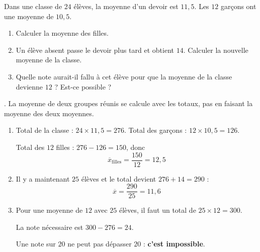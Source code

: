 
\newcommand{\R}{\mathbb{R}}
\newcommand{\vect}[1]{\overrightarrow{#1}}

Dans une classe de $24$ élèves, la moyenne d'un devoir est $11{,}5$. Les $12$ garçons ont une moyenne de $10{,}5$.
\begin{enumerate}
  \item Calculer la moyenne des filles.
  \item Un élève absent passe le devoir plus tard et obtient $14$. Calculer la nouvelle moyenne de la classe.
  \item Quelle note aurait-il fallu à cet élève pour que la moyenne de la classe devienne $12$ ? Est-ce possible ?
\end{enumerate}

\begin{prop}
. La moyenne de deux groupes réunis se calcule avec les totaux, pas en faisant la moyenne des deux moyennes.
\end{prop}
\begin{enumerate}[itemsep=14pt]
  \item Total de la classe : $24\times11{,}5=276$. \quad Total des garçons : $12\times10{,}5=126$.

  Total des $12$ filles : $276-126=150$, donc
  \[\overline x_{\text{filles}}=\dfrac{150}{12}=12{,}5\]

  \item Il y a maintenant $25$ élèves et le total devient $276+14=290$ :
  \[\overline x=\dfrac{290}{25}=11{,}6\]

  \item Pour une moyenne de $12$ avec $25$ élèves, il faut un total de $25\times12=300$.

  La note nécessaire est $300-276=24$.

  Une note sur $20$ ne peut pas dépasser $20$ : \textbf{c'est impossible}.
\end{enumerate}
